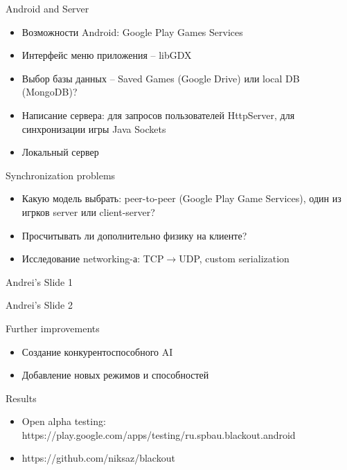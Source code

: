 \documentclass[12pt]{beamer}
\begin{document}
\begin{frame} {Android and Server}
    \begin{itemize}
        \item <1-> Возможности Android: Google Play Games Services
        \item <2-> Интерфейс меню приложения -- libGDX
        \item <3-> Выбор базы данных -- Saved Games (Google Drive) или local DB (MongoDB)?
        \item <4-> Написание сервера: для запросов пользователей HttpServer, для синхронизации игры Java Sockets
        \item <5-> Локальный сервер
    \end{itemize}
\end{frame}


\begin{frame} {Synchronization problems}
    \begin{itemize}
    	\item <1-> Какую модель выбрать: peer-to-peer (Google Play Game Services), один из игрков server или client-server?
	\item <2-> Просчитывать ли дополнительно физику на клиенте?
	\item <3-> Исследование networking-а: TCP$\rightarrow$UDP, custom serialization
    \end{itemize}
\end{frame}


\begin{frame} {Andrei's Slide 1}
\end{frame}


\begin{frame}{Andrei's Slide 2}
\end{frame}


\begin{frame}{Further improvements}
    \begin{itemize}
        \item <1-> Создание конкурентоспособного AI
        \item <2-> Добавление новых режимов и способностей
    \end{itemize}
\end{frame}


\begin{frame}{Results}
    \begin{itemize}
        \item <1-> Open alpha testing: \\ https://play.google.com/apps/testing/ru.spbau.blackout.android
        \item <2-> https://github.com/niksaz/blackout
    \end{itemize}

\end{frame}
\end{document}
